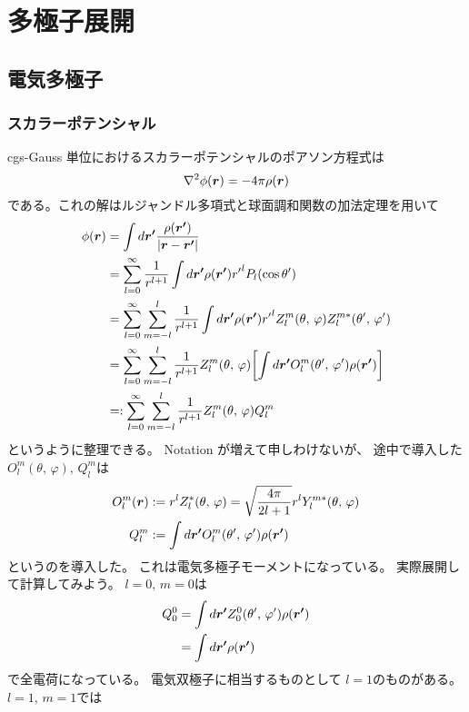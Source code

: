 \documentclass[../../master.tex]{subfiles}
\begin{document}
\chapter{多極子展開}
\section{電気多極子}
\subsection{スカラーポテンシャル}
cgs-Gauss 単位におけるスカラーポテンシャルのポアソン方程式は
\begin{equation}
    \laplacian \phi(\vb*{r}) = -4\pi\rho(\vb*{r})
\end{equation}
である。これの解はルジャンドル多項式と球面調和関数の加法定理を用いて
\begin{align}
    \phi(\vb*{r})
    &= \int d\vb*{r'} \frac{\rho(\vb*{r'})}{\abs{\vb*{r}-\vb*{r'}}}\\
    &= \sum_{l=0}^{\infty} \frac{1}{r^{l+1}} \int d\vb*{r'} \rho(\vb*{r'}) {r'}^{l} P_l(\cos\theta')\\
    &= \sum_{l=0}^{\infty} \sum_{m=-l}^{l} \frac{1}{r^{l+1}}\int d\vb*{r'} \rho(\vb*{r'}){r'}^l Z_l^m(\theta,\,\varphi) Z_l^{m*} (\theta',\,\varphi')\\
    &= \sum_{l=0}^{\infty} \sum_{m=-l}^{l} \frac{1}{r^{l+1}}Z_l^m(\theta,\,\varphi) \qty[\int d\vb*{r'} O_l^{m} (\theta',\,\varphi')\rho(\vb*{r'})]\\
    &=:\sum_{l=0}^{\infty} \sum_{m=-l}^{l} \frac{1}{r^{l+1}}Z_l^m(\theta,\,\varphi) Q_l^m
\end{align}
というように整理できる。
Notation が増えて申しわけないが、
途中で導入した\(O_l^m(\theta,\,\varphi),\,Q_l^m\)は
\begin{align}
    O_l^m(\vb*{r}) &:= r^l Z_l^{*}(\theta,\,\varphi) = \sqrt{\frac{4\pi}{2l+1}}r^lY_l^{m*}(\theta,\,\varphi)\\
    Q_l^m &:= \int d\vb*{r'} O_l^{m} (\theta',\,\varphi') \rho(\vb*{r'})
\end{align}
というのを導入した。
これは電気多極子モーメントになっている。
実際展開して計算してみよう。
\(l=0,\,m=0\)は
\begin{align}
    Q_0^0
    &= \int d\vb*{r'}  Z_0^0 (\theta',\,\varphi') \rho(\vb*{r'})\\
    &= \int d\vb*{r'} \rho(\vb*{r'})
\end{align}
で全電荷になっている。
電気双極子に相当するものとして
\(l=1\)のものがある。
\(l=1,\,m = 1\)では
\end{document}
